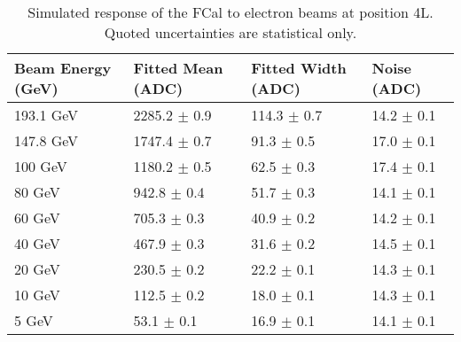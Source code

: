 \begin{table}[p]
\begin{center}
\begin{tabular}{|l|l|l|l|}
\hline
Beam Energy (GeV) & Fitted Mean (ADC)& Fitted Width (ADC)& Noise (ADC) \\
\hline
193.1 GeV  &  2285.2 $\pm$     0.9 &   114.3 $\pm$     0.7 &    14.2 $\pm$     0.1 \\
147.8 GeV  &  1747.4 $\pm$     0.7 &    91.3 $\pm$     0.5 &    17.0 $\pm$     0.1 \\
100 GeV  &  1180.2 $\pm$     0.5 &    62.5 $\pm$     0.3 &    17.4 $\pm$     0.1 \\
80 GeV  &   942.8 $\pm$     0.4 &    51.7 $\pm$     0.3 &    14.1 $\pm$     0.1 \\
60 GeV  &   705.3 $\pm$     0.3 &    40.9 $\pm$     0.2 &    14.2 $\pm$     0.1 \\
40 GeV  &   467.9 $\pm$     0.3 &    31.6 $\pm$     0.2 &    14.5 $\pm$     0.1 \\
20 GeV  &   230.5 $\pm$     0.2 &    22.2 $\pm$     0.1 &    14.3 $\pm$     0.1 \\
10 GeV  &   112.5 $\pm$     0.2 &    18.0 $\pm$     0.1 &    14.3 $\pm$     0.1 \\
5 GeV  &    53.1 $\pm$     0.1 &    16.9 $\pm$     0.1 &    14.1 $\pm$     0.1 \\
\hline
\end{tabular}
\end{center}
\caption[Simulated response of the FCal to electron beams at position 4L]{Simulated response of the FCal to electron beams at position 4L. Quoted uncertainties are statistical only.}
\label{TBres_table_elec_4LMC}
\end{table}









